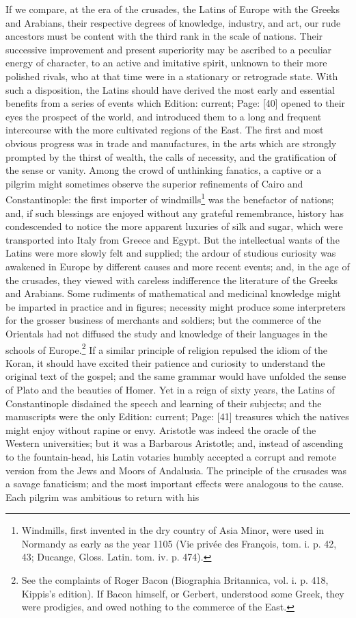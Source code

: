 If we compare, at the era of the crusades, the Latins of Europe with the Greeks and Arabians, their respective degrees of knowledge, industry, and art, our rude ancestors must be content with the third rank in the scale of nations. Their successive improvement and present superiority may be ascribed to a peculiar energy of character, to an active and imitative spirit, unknown to their more polished rivals, who at that time were in a stationary or retrograde state. With such a disposition, the Latins should have derived the most early and essential benefits from a series of events which Edition: current; Page: [40] opened to their eyes the prospect of the world, and introduced them to a long and frequent intercourse with the more cultivated regions of the East. The first and most obvious progress was in trade and manufactures, in the arts which are strongly prompted by the thirst of wealth, the calls of necessity, and the gratification of the sense or vanity. Among the crowd of unthinking fanatics, a captive or a pilgrim might sometimes observe the superior refinements of Cairo and Constantinople: the first importer of windmills\footnote{Windmills, first invented in the dry country of Asia Minor, were used in Normandy as early as the year 1105 (Vie privée des François, tom. i. p. 42, 43; Ducange, Gloss. Latin. tom. iv. p. 474).} was the benefactor of nations; and, if such blessings are enjoyed without any grateful remembrance, history has condescended to notice the more apparent luxuries of silk and sugar, which were transported into Italy from Greece and Egypt. But the intellectual wants of the Latins were more slowly felt and supplied; the ardour of studious curiosity was awakened in Europe by different causes and more recent events; and, in the age of the crusades, they viewed with careless indifference the literature of the Greeks and Arabians. Some rudiments of mathematical and medicinal knowledge might be imparted in practice and in figures; necessity might produce some interpreters for the grosser business of merchants and soldiers; but the commerce of the Orientals had not diffused the study and knowledge of their languages in the schools of Europe.\footnote{See the complaints of Roger Bacon (Biographia Britannica, vol. i. p. 418, Kippis\texthebrew{}’s edition). If Bacon himself, or Gerbert, understood some Greek, they were prodigies, and owed nothing to the commerce of the East.} If a similar principle of religion repulsed the idiom of the Koran, it should have excited their patience and curiosity to understand the original text of the gospel; and the same grammar would have unfolded the sense of Plato and the beauties of Homer. Yet in a reign of sixty years, the Latins of Constantinople disdained the speech and learning of their subjects; and the manuscripts were the only Edition: current; Page: [41] treasures which the natives might enjoy without rapine or envy. Aristotle was indeed the oracle of the Western universities; but it was a Barbarous Aristotle; and, instead of ascending to the fountain-head, his Latin votaries humbly accepted a corrupt and remote version from the Jews and Moors of Andalusia. The principle of the crusades was a savage fanaticism; and the most important effects were analogous to the cause. Each pilgrim was ambitious to return with his 